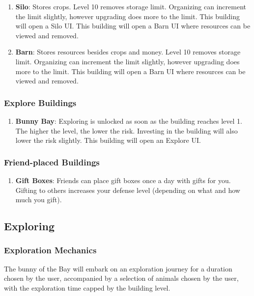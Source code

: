 \documentclass[12pt]{article}
\begin{document}
\begin{enumerate}
    \item \textbf{Silo}: Stores crops. Level 10 removes storage limit. Organizing can increment the limit slightly, however upgrading does more to the limit. This building will open a Silo UI. This building will open a Barn UI where resources can be viewed and removed.
    \item \textbf{Barn}: Stores resources besides crops and money. Level 10 removes storage limit. Organizing can increment the limit slightly, however upgrading does more to the limit. This building will open a Barn UI where resources can be viewed and removed.
\end{enumerate}

\subsubsection{Explore Buildings}

\begin{enumerate}
    \item \textbf{Bunny Bay}: Exploring is unlocked as soon as the building reaches level 1. The higher the level, the lower the risk. Investing in the building will also lower the risk slightly. This building will open an Explore UI.
\end{enumerate}

\subsubsection{Friend-placed Buildings}

\begin{enumerate}
    \item \textbf{Gift Boxes}: Friends can place gift boxes once a day with gifts for you. Gifting to others increases your defense level (depending on what and how much you gift).
\end{enumerate}

\subsection{Exploring}

\subsubsection{Exploration Mechanics}

The bunny of the Bay will embark on an exploration journey for a duration chosen by the user, accompanied by a selection of animals chosen by the user, with the exploration time capped by the building level.
\end{document}
